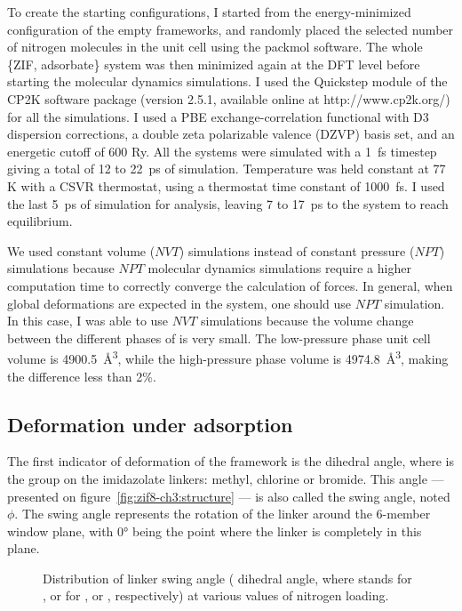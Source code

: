 \documentclass[thesis]{subfiles}
\begin{document}
To create the starting configurations, I started from the energy-minimized
configuration of the empty frameworks, and randomly placed the selected number
of nitrogen molecules in the unit cell using the packmol
software\cite{Martnez2009}. The whole \{ZIF, adsorbate\} system was then
minimized again at the DFT level before starting the molecular dynamics
simulations. I used the Quickstep module\cite{VandeVondele2005} of the CP2K
software package (version 2.5.1, available online at http://www.cp2k.org/) for
all the simulations. I used a PBE exchange-correlation functional with D3
dispersion corrections, a double zeta polarizable valence (DZVP) basis set, and
an energetic cutoff of 600 Ry. All the systems were simulated with a \SI{1}{fs}
timestep giving a total of 12 to \SI{22}{ps} of simulation. Temperature was held
constant at 77 K with a CSVR thermostat, using a thermostat time constant of
\SI{1000}{fs}. I used the last \SI{5}{ps} of simulation for analysis, leaving 7
to \SI{17}{ps} to the system to reach equilibrium.

We used constant volume ($NVT$) simulations instead of constant pressure ($NPT$)
simulations because $NPT$ molecular dynamics simulations require a higher
computation time to correctly converge the calculation of forces. In general,
when global deformations are expected in the system, one should use $NPT$
simulation. In this case, I was able to use $NVT$ simulations because the volume
change between the different phases of  is very small. The low-pressure
phase unit cell volume is \SI{4900.5}{\AA^3}, while the high-pressure phase
volume is \SI{4974.8}{\AA^3}, making the difference less than 2\%.

\subsection{Deformation under adsorption}
\label{sec:zif8x:swing}

The first indicator of deformation of the framework is the 
dihedral angle, where  is the group on the imidazolate linkers: methyl,
chlorine or bromide. This angle --- presented on
figure~\ref{fig:zif8-ch3:structure} --- is also called the swing angle, noted
$\phi$. The swing angle represents the rotation of the linker around the 6-member
window plane, with 0° being the point where the linker is completely in this
plane.

\begin{figure}[ht]
    \centering
    
    \caption{Distribution of linker swing angle ( dihedral angle,
    where  stands for ,  or  for , \ZIFCl or
    \ZIFBr, respectively) at various values of nitrogen loading.}
    \label{fig:zif8x:dihedrals}
\end{figure}
\end{document}
